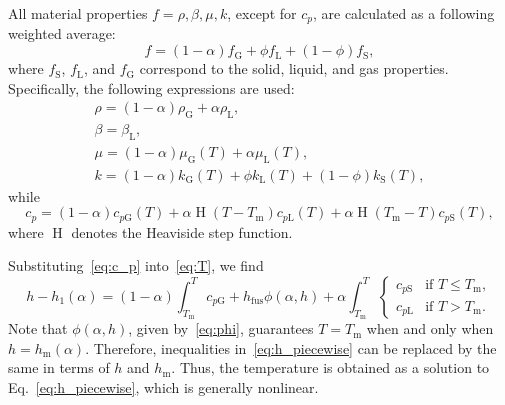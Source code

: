 \documentclass[final]{elsarticle} %
\DeclareMathOperator{\Heaviside}{H}
\newcommand{\fusion}[1]{{#1}_\text{fus}}
\newcommand{\sol}{\text{S}}
\newcommand{\liq}{\text{L}}
\newcommand{\gas}{\text{G}}
\newcommand{\melt}{\text{m}}
\begin{document}
All material properties $f = \rho, \beta, \mu, k$, except for $c_p$,
are calculated as a following weighted average:
\begin{equation}\label{eq:properties}
    f = (1-\alpha)f_\gas + \phi f_\liq + (1-\phi)f_\sol,
\end{equation}
where $f_\sol$, $f_\liq$, and $f_\gas$ correspond to the solid, liquid, and gas properties.
Specifically, the following expressions are used:
\begin{gather}
    \rho = (1-\alpha)\rho_\gas + \alpha\rho_\liq, \label{eq:rho}\\
    \beta = \beta_\liq, \label{eq:beta}\\
    \mu = (1-\alpha)\mu_\gas(T) + \alpha\mu_\liq(T), \label{eq:mu}\\
    k = (1-\alpha)k_\gas(T) + \phi k_\liq(T) + (1-\phi)k_\sol(T), \label{eq:k}
\end{gather}
while
\begin{equation}\label{eq:c_p}
    c_p = (1-\alpha)c_{p\gas}(T) + \alpha\Heaviside(T-T_\melt)c_{p\liq}(T)
        + \alpha\Heaviside(T_\melt-T)c_{p\sol}(T),
\end{equation}
where $\Heaviside$ denotes the Heaviside step function.

Substituting~\eqref{eq:c_p} into~\eqref{eq:T}, we find
\begin{equation}\label{eq:h_piecewise}
    h - h_1(\alpha) = (1-\alpha)\int_{T_\melt}^T c_{p\gas} + \fusion{h}\phi(\alpha,h)
        + \alpha\int_{T_\melt}^T
    \begin{cases}
        c_{p\sol} &\text{if } T \leq T_\melt, \\
        c_{p\liq} &\text{if } T > T_\melt.
    \end{cases}
\end{equation}
Note that $\phi(\alpha,h)$, given by~\eqref{eq:phi},
guarantees $T=T_\melt$ when and only when $h=h_\melt(\alpha)$.
Therefore, inequalities in~\eqref{eq:h_piecewise} can be replaced by the same
in terms of $h$ and $h_\melt$.
Thus, the temperature is obtained as a solution to Eq.~\eqref{eq:h_piecewise},
which is generally nonlinear.
\end{document}
